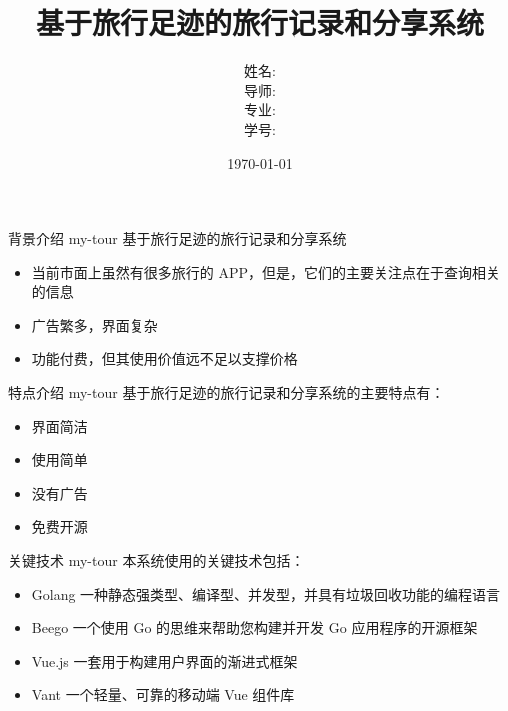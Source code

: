 \documentclass[14pt,notheorems]{beamer}
\newcommand{\mylead}[1]{\textcolor{acolor1}{#1}}
\begin{document}
\title{基于旅行足迹的旅行记录和分享系统}
\author[周翔辉]
{姓名: \\
  导师: \\
  专业: \\
  学号: }

\date{\today}

\begin{frame}[plain]\transboxout
\titlepage
\end{frame}


\begin{frame}{背景介绍}
  \mylead{my-tour} 基于旅行足迹的旅行记录和分享系统 \pause
\begin{itemize}[<+->]
\item 当前市面上虽然有很多旅行的 APP，但是，它们的主要关注点在于查询相关的信息
\item 广告繁多，界面复杂
\item 功能付费，但其使用价值远不足以支撑价格
\end{itemize}
\end{frame}

\begin{frame}{ 特点介绍 }
  \mylead{my-tour} 基于旅行足迹的旅行记录和分享系统的主要特点有： \pause
  \begin{itemize}[<+->]
    \item 界面简洁
    \item 使用简单
    \item 没有广告
    \item 免费开源
  \end{itemize}

\end{frame}

\begin{frame}{关键技术}
  \mylead{my-tour} 本系统使用的关键技术包括：\pause
  \begin{itemize}[<+->]
    \item Golang \pause 一种静态强类型、编译型、并发型，并具有垃圾回收功能的编程语言 \pause
    \item Beego \pause 一个使用 Go 的思维来帮助您构建并开发 Go 应用程序的开源框架 \pause
    \item Vue.js \pause 一套用于构建用户界面的渐进式框架 \pause
    \item Vant \pause 一个轻量、可靠的移动端 Vue 组件库 \pause
  \end{itemize}

\end{frame}
\end{document}
